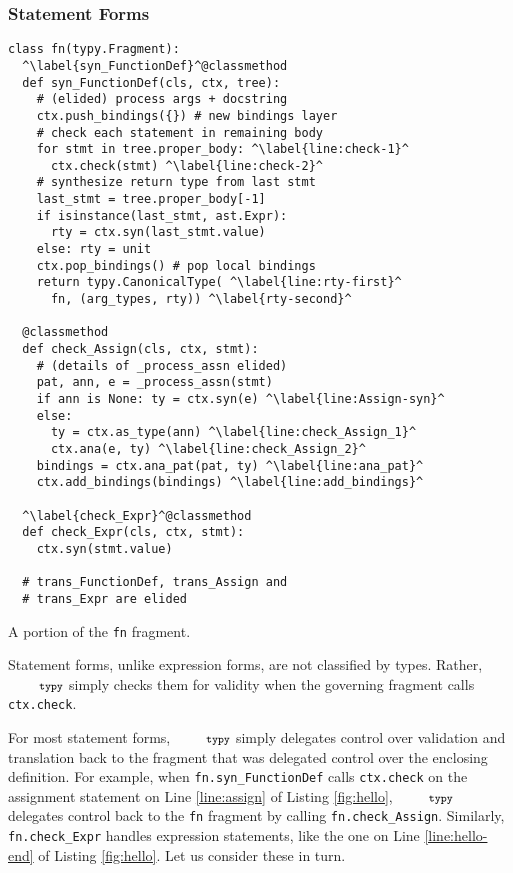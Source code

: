 \documentclass[10pt]{sigplanconf}
\newcommand{\typy}{\texttt{\footnotesize typy}}
\newcommand{\lip}[1]{\lstinline[language=Python,basicstyle=\ttfamily\footnotesize,morekeywords={with},deletendkeywords={tuple,buffer,map}]{#1}}
\newcommand{\li}[1]{\lip{#1}}
\begin{document}
\subsubsection{Statement Forms}\label{sec:statements}
\begin{codelisting}
\vspace{-3px}
\begin{lstlisting}
class fn(typy.Fragment):
  ^\label{syn_FunctionDef}^@classmethod
  def syn_FunctionDef(cls, ctx, tree):
    # (elided) process args + docstring
    ctx.push_bindings({}) # new bindings layer
    # check each statement in remaining body
    for stmt in tree.proper_body: ^\label{line:check-1}^
      ctx.check(stmt) ^\label{line:check-2}^
    # synthesize return type from last stmt
    last_stmt = tree.proper_body[-1]
    if isinstance(last_stmt, ast.Expr): 
      rty = ctx.syn(last_stmt.value)
    else: rty = unit
    ctx.pop_bindings() # pop local bindings
    return typy.CanonicalType( ^\label{line:rty-first}^
      fn, (arg_types, rty)) ^\label{rty-second}^

  @classmethod
  def check_Assign(cls, ctx, stmt):
    # (details of _process_assn elided)
    pat, ann, e = _process_assn(stmt)
    if ann is None: ty = ctx.syn(e) ^\label{line:Assign-syn}^
    else:
      ty = ctx.as_type(ann) ^\label{line:check_Assign_1}^
      ctx.ana(e, ty) ^\label{line:check_Assign_2}^
    bindings = ctx.ana_pat(pat, ty) ^\label{line:ana_pat}^
    ctx.add_bindings(bindings) ^\label{line:add_bindings}^

  ^\label{check_Expr}^@classmethod
  def check_Expr(cls, ctx, stmt):
    ctx.syn(stmt.value)
    
  # trans_FunctionDef, trans_Assign and 
  # trans_Expr are elided 
\end{lstlisting}
\caption{A portion of the \li{fn} fragment.}
\label{fig:fn}
\end{codelisting}
Statement forms, unlike expression forms, are not classified by types. Rather, $\typy$ simply checks them for validity when the governing fragment calls \li{ctx.check}. 

For most statement forms, $\typy$ simply delegates control over validation and translation back to the fragment that was delegated control over the enclosing definition. For example, when \li{fn.syn_FunctionDef} calls \li{ctx.check} on the assignment statement on Line \ref{line:assign} of Listing \ref{fig:hello}, $\typy$ delegates control back to the \li{fn} fragment by calling \li{fn.check_Assign}. Similarly, \li{fn.check_Expr} handles expression statements, like the one on Line \ref{line:hello-end} of Listing \ref{fig:hello}. Let us consider these in turn.
\end{document}
